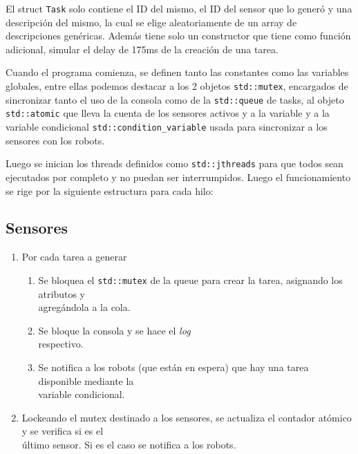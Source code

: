 \documentclass[11pt, a4paper]{article}
\begin{document}
\begin{multicols}{2}
El struct \lstinline|Task| solo contiene el ID del mismo, el ID del sensor que lo generó y una descripción del mismo, la cual se elige aleatoriamente de un array de descripciones genéricas. Además tiene solo un constructor que tiene como función adicional, simular el delay de 175ms de la creación de una tarea.

Cuando el programa comienza, se definen tanto las constantes como las variables globales, entre ellas podemos destacar a los 2 objetos \lstinline|std::mutex|, encargados de sincronizar tanto el uso de la consola como de la \lstinline|std::queue| de tasks, al objeto \lstinline|std::atomic| que lleva la cuenta de los sensores activos y a la variable y a la variable condicional \lstinline|std::condition_variable| usada para sincronizar a los sensores con los robots.

Luego se inician los threads definidos como \lstinline|std::jthreads| para que todos sean ejecutados por completo y no puedan ser interrumpidos. Luego el funcionamiento se rige por la siguiente estructura para cada hilo:

\subsection{Sensores}

\begin{enumerate}[label=\Roman*.]
    \item Por cada tarea a generar 
    \begin{enumerate}[label=\roman*.]
        \item Se bloquea el \lstinline|std::mutex| de la queue para crear la tarea, asignando los atributos y\\agregándola a la cola.
        \item Se bloque la consola y se hace el \textit{log}\\respectivo.
        \item Se notifica a los robots (que están en espera) que hay una tarea disponible mediante la\\variable condicional.
    \end{enumerate}
    \item Lockeando el mutex destinado a los sensores, se actualiza el contador atómico y se verifica si es el\\último sensor. Si es el caso se notifica a los robots.
\end{enumerate}

\vspace{15ex}


\end{multicols}
\end{document}
